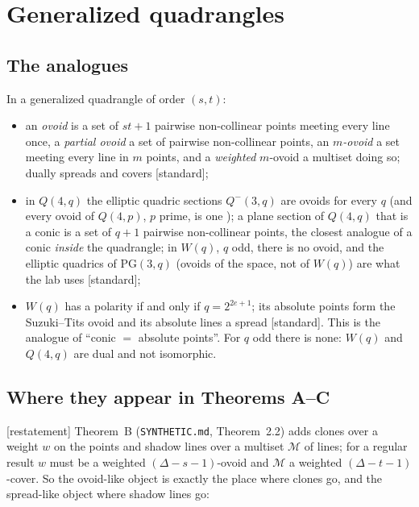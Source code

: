 \documentclass[11pt]{amsart}
\theoremstyle{definition}
\theoremstyle{remark}
\newcommand{\cM}{\mathcal{M}}
\newcommand{\PG}{\mathrm{PG}}
\newcommand{\status}[1]{\textup{[#1]}}
\begin{document}
\section{Generalized quadrangles}

\subsection{The analogues}
In a generalized quadrangle of order $(s,t)$:
\begin{itemize}
\item an \emph{ovoid} is a set of $st+1$ pairwise non-collinear points meeting every line once, a \emph{partial
ovoid} a set of pairwise non-collinear points, an \emph{$m$-ovoid} a set meeting every line in $m$ points, and a
\emph{weighted} $m$-ovoid a multiset doing so; dually spreads and covers \status{standard};
\item in $Q(4,q)$ the elliptic quadric sections $Q^-(3,q)$ are ovoids for every $q$ (and every ovoid of
$Q(4,p)$, $p$ prime, is one \cite{BGS06}); a plane section of $Q(4,q)$ that is a conic is a set of $q+1$ pairwise
non-collinear points, the closest analogue of a conic \emph{inside} the quadrangle; in $W(q)$, $q$ odd, there is no
ovoid, and the elliptic quadrics of $\PG(3,q)$ (ovoids of the space, not of $W(q)$) are what the lab uses \status{standard};
\item $W(q)$ has a polarity if and only if $q=2^{2e+1}$; its absolute points form the Suzuki--Tits ovoid and its
absolute lines a spread \cite{VM98} \status{standard}. This is the analogue of ``conic $=$ absolute points''. For $q$ odd
there is none: $W(q)$ and $Q(4,q)$ are dual and not isomorphic.
\end{itemize}

\subsection{Where they appear in Theorems A--C}
\status{restatement} Theorem~B (\texttt{SYNTHETIC.md}, Theorem~2.2) adds clones over a weight $w$ on the points and
shadow lines over a multiset $\cM$ of lines; for a regular result $w$ must be a weighted $(\Delta-s-1)$-ovoid and
$\cM$ a weighted $(\Delta-t-1)$-cover. So the ovoid-like object is exactly the place where clones go, and the
spread-like object where shadow lines go:
\end{document}
